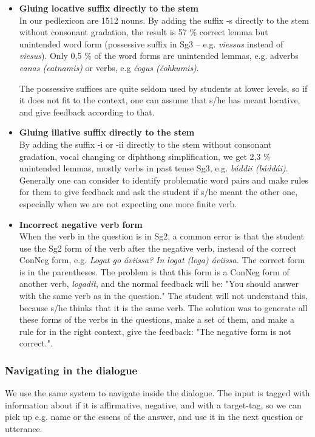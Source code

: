 \documentclass[a4paper,12pt]{article}
\begin{document}
\begin{itemize}

\item \textbf{Gluing locative suffix directly to the stem} \\
In our pedlexicon are 1512 nouns. By adding the suffix -s directly to the stem without consonant gradation, the result is 57 \% correct lemma but unintended word form (possessive suffix in Sg3 -- e.g. \textit{viessus} instead of \textit{viesus}). Only 0,5 \% of the word forms are unintended lemmas, e.g. adverbs \textit{eanas  (eatnamis)} or verbs, e.g \textit{čogus (čohkumis)}.

The possessive suffices are quite seldom used by students at lower levels, so if it does not fit to the context, one can assume that s/he has meant locative, and give feedback according to that. 

\item \textbf{Gluing illative suffix directly to the stem}\\
By adding the suffix -i or -ii directly to the stem without consonant gradation, vocal changing or diphthong simplification, we get 2,3 \% unintended lemmas, mostly verbs in past tense Sg3, e.g. \textit{báddii (báddái)}. Generally one can consider to identify problematic word pairs and make rules for them to give feedback and ask the student if s/he meant the other one, especially when we are not expecting one more finite verb.

\item \textbf{Incorrect negative verb form}\\
When the verb in the question is in Sg2, a common error is that the student use the Sg2 form of the verb after the negative verb, instead of the correct ConNeg form, e.g. \textit{Logat go áviissa? In logat (loga) áviissa.} The correct form is in the parentheses. The problem is that this form is a ConNeg form of another verb, \textit{logadit}, and the normal feedback will be: "You should answer with the same verb as in the question." The student will not understand this, because s/he thinks that it is the same verb. The solution was to generate all these forms of the verbs in the questions, make a set of them, and make a rule for in the right context, give the feedback: "The negative form is not correct.". 
\end{itemize}


\subsubsection{Navigating in the dialogue}
We use the same system to navigate inside the dialogue. The input is tagged with information about if it is affirmative, negative, and with a target-tag, so we can pick up e.g. name or the essens of the answer, and use it in the next question or utterance. 
\end{document}
